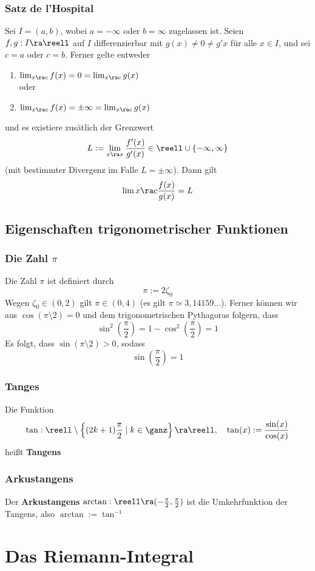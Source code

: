 \documentclass{kit}
\begin{document}
    \subsubsection{Satz de l'Hospital}
      Sei $I=(a,b)$, wobei $a=-\infty$ oder $b=\infty$ zugelassen ist. Seien $f,g:I\ra\reell$ auf $I$ differenzierbar mit $g(x)\neq0\neq g'{x}$ für alle $x\in I$, und sei $c=a$ oder $c=b$. Ferner gelte entweder
      \begin{enumerate}
        \item $\lim_{x\ra c}f(x)=0=\lim_{x\ra c}g(x)$\\
          oder
        \item $\lim_{x\ra c}f(x)=\pm\infty=\lim_{x\ra c}g(x)$
      \end{enumerate}
      und es existiere zusätlich der Grenzwert
      $$L:=\lim_{x\ra x}\frac{f'(x)}{g'(x)}\in\reell\cup\{-\infty,\infty\}$$
      (mit bestimmter Divergenz im Falle $L=\pm\infty$). Dann gilt
      $$\lim{x\ra c}\frac{f(x)}{g(x)}=L$$
  \subsection{Eigenschaften trigonometrischer Funktionen}
    \subsubsection{Die Zahl \texorpdfstring{$\pi$}j}
      Die Zahl $\pi$ ist definiert durch 
      $$\pi:=2\zeta_0$$
      Wegen $\zeta_0\in(0,2)$ gilt $\pi\in(0,4)$ (es gilt $\pi\simeq3,14159\dots$). Ferner können wir aus $\cos(\pi\setminus2)=0$ und dem trigonometrischen Pythagoras folgern, dass
      $$\sin^2\left(\frac{\pi}{2}\right)=1-\cos^2\left(\frac{\pi}{2}\right)=1$$
      Es folgt, dass $\sin(\pi\setminus2)>0$, sodass
      $$\sin(\frac{\pi}{2})=1$$
    \subsubsection{Tanges}
      Die Funktion
      $$\tan:\reell\setminus\left\{(2k+1)\frac{\pi}{2}\mid k\in\ganz\right\}\ra\reell,\quad\tan(x):=\frac{\sin(x)}{\cos(x)}$$
      heißt \textbf{Tangens}
    \subsubsection{Arkustangens}
      Der \textbf{Arkustangens} $\arctan:\reell\ra(-\frac{\pi}{2},\frac{\pi}{2})$ ist die Umkehrfunktion der Tangens, also $\arctan:=\tan^{-1}$
\section{Das Riemann-Integral}
\end{document}
